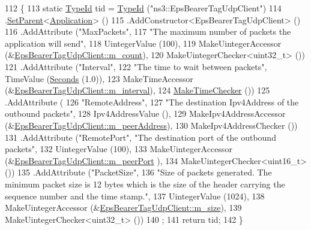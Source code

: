 \begin{DoxyCode}
112 \{
113   \textcolor{keyword}{static} \hyperlink{classns3_1_1TypeId}{TypeId} tid = \hyperlink{classns3_1_1TypeId}{TypeId} (\textcolor{stringliteral}{"ns3::EpsBearerTagUdpClient"})
114     .\hyperlink{classns3_1_1TypeId_abaaca67ab7d2471067e7c275df0f7309}{SetParent}<\hyperlink{classns3_1_1Application}{Application}> ()
115     .AddConstructor<EpsBearerTagUdpClient> ()
116     .AddAttribute (\textcolor{stringliteral}{"MaxPackets"},
117                    \textcolor{stringliteral}{"The maximum number of packets the application will send"},
118                    UintegerValue (100),
119                    MakeUintegerAccessor (&\hyperlink{classEpsBearerTagUdpClient_a1dc79f7507b3c34797a8793f0fb83aba}{EpsBearerTagUdpClient::m\_count}),
120                    MakeUintegerChecker<uint32\_t> ())
121     .AddAttribute (\textcolor{stringliteral}{"Interval"},
122                    \textcolor{stringliteral}{"The time to wait between packets"}, TimeValue (\hyperlink{group__timecivil_ga33c34b816f8ff6628e33d5c8e9713b9e}{Seconds} (1.0)),
123                    MakeTimeAccessor (&\hyperlink{classEpsBearerTagUdpClient_ae4d0ca67d266f8e1a7684e87a9cf7fec}{EpsBearerTagUdpClient::m\_interval}),
124                    \hyperlink{group__time_ga7032965bd4afa578691d88c09e4481c1}{MakeTimeChecker} ())
125     .AddAttribute (
126       \textcolor{stringliteral}{"RemoteAddress"},
127       \textcolor{stringliteral}{"The destination Ipv4Address of the outbound packets"},
128       Ipv4AddressValue (),
129       MakeIpv4AddressAccessor (&\hyperlink{classEpsBearerTagUdpClient_abed599c67599f9954fb9a4664889717f}{EpsBearerTagUdpClient::m\_peerAddress}),
130       MakeIpv4AddressChecker ())
131     .AddAttribute (\textcolor{stringliteral}{"RemotePort"}, \textcolor{stringliteral}{"The destination port of the outbound packets"},
132                    UintegerValue (100),
133                    MakeUintegerAccessor (&\hyperlink{classEpsBearerTagUdpClient_a138e428cd5597ffe5a1935c9788c7961}{EpsBearerTagUdpClient::m\_peerPort}
      ),
134                    MakeUintegerChecker<uint16\_t> ())
135     .AddAttribute (\textcolor{stringliteral}{"PacketSize"},
136                    \textcolor{stringliteral}{"Size of packets generated. The minimum packet size is 12 bytes which is the size of the
       header carrying the sequence number and the time stamp."},
137                    UintegerValue (1024),
138                    MakeUintegerAccessor (&\hyperlink{classEpsBearerTagUdpClient_a80eea46d1ecfcd76eef1cd079e5c4088}{EpsBearerTagUdpClient::m\_size}),
139                    MakeUintegerChecker<uint32\_t> ())
140   ;
141   \textcolor{keywordflow}{return} tid;
142 \}
\end{DoxyCode}


